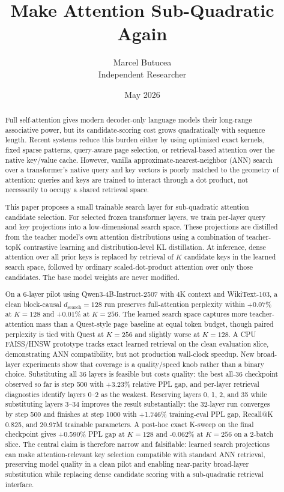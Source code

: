 \documentclass[10pt]{article}
\title{Make Attention Sub-Quadratic Again}
\author{Marcel Butucea\\Independent Researcher}
\date{May 2026}
\begin{document}
\maketitle

\begin{abstract}
Full self-attention gives modern decoder-only language models their long-range
associative power, but its candidate-scoring cost grows quadratically with
sequence length. Recent systems reduce this burden either by using optimized
exact kernels, fixed sparse patterns, query-aware page selection, or
retrieval-based attention over the native key/value cache. However, vanilla
approximate-nearest-neighbor (ANN) search over a transformer's native query and
key vectors is poorly matched to the geometry of attention: queries and keys
are trained to interact through a dot product, not necessarily to occupy a
shared retrieval space.

This paper proposes a small trainable search layer for sub-quadratic attention
candidate selection. For selected frozen transformer layers, we train per-layer
query and key projections into a low-dimensional search space. These projections
are distilled from the teacher model's own attention distributions using a
combination of teacher-topK contrastive learning and distribution-level KL
distillation. At inference, dense attention over all prior keys is replaced by
retrieval of $K$ candidate keys in the learned search space, followed by
ordinary scaled-dot-product attention over only those candidates. The base model
weights are never modified.

On a 6-layer pilot using Qwen3-4B-Instruct-2507 with 4K context and WikiText-103,
a clean block-causal $d_{\mathrm{search}}=128$ run preserves full-attention
perplexity within +0.07\% at $K=128$ and +0.01\% at $K=256$. The learned search
space captures more teacher-attention mass than a Quest-style page baseline at
equal token budget, though paired perplexity is tied with Quest at $K=256$ and
slightly worse at $K=128$. A CPU FAISS/HNSW prototype tracks exact learned
retrieval on the clean evaluation slice, demonstrating ANN compatibility, but
not production wall-clock speedup. New broad-layer experiments show that
coverage is a quality/speed knob rather than a binary choice. Substituting all
36 layers is feasible but costs quality: the best all-36 checkpoint observed so
far is step 500 with +3.23\% relative PPL gap, and per-layer retrieval
diagnostics identify layers 0--2 as the weakest. Reserving layers 0, 1, 2, and
35 while substituting layers 3--34 improves the result substantially: the
32-layer run converges by step 500 and finishes at step 1000 with +1.746\%
training-eval PPL gap, Recall@K 0.825, and 20.97M trainable parameters. A
post-hoc exact K-sweep on the final checkpoint gives +0.590\% PPL gap at
$K=128$ and -0.062\% at $K=256$ on a 2-batch slice. The central claim is
therefore narrow and falsifiable: learned search projections can make
attention-relevant key selection compatible with standard ANN retrieval,
preserving model quality in a clean pilot and enabling near-parity broad-layer
substitution while replacing dense candidate scoring with a sub-quadratic
retrieval interface.
\end{abstract}
\end{document}
